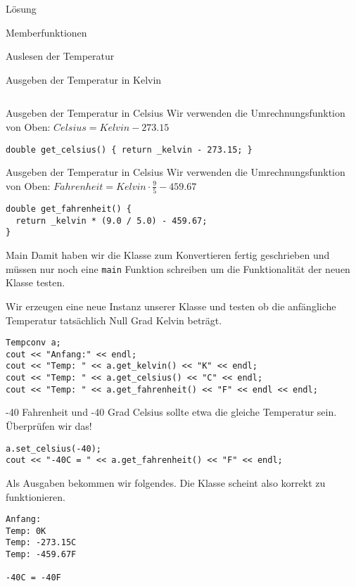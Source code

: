 \documentclass[presentation]{beamer}
\begin{document}
\begin{frame}[label={sec:org40f99e4},fragile]{Lösung}
\begin{block}{Memberfunktionen}
\begin{block}{Auslesen der Temperatur}
\begin{block}{Ausgeben der Temperatur in Kelvin}
\begin{verbatim}
\end{verbatim}
\end{block}
\begin{block}{Ausgeben der Temperatur in Celsius}
Wir verwenden die Umrechnungsfunktion von Oben: \(Celsius = Kelvin - 273.15\)
\begin{verbatim}
double get_celsius() { return _kelvin - 273.15; }
\end{verbatim}
\end{block}
\begin{block}{Ausgeben der Temperatur in Celsius}
Wir verwenden die Umrechnungsfunktion von Oben: \(Fahrenheit = Kelvin \cdot\frac{9}{5} - 459.67\)
\begin{verbatim}
double get_fahrenheit() {
  return _kelvin * (9.0 / 5.0) - 459.67;
}
\end{verbatim}
\end{block}
\end{block}
\end{block}
\begin{block}{Main}
Damit haben wir die Klasse zum Konvertieren fertig geschrieben und
müssen nur noch eine {\color{solarizedYellow}\verb!main!} Funktion schreiben um die Funktionalität
der neuen Klasse testen.

Wir erzeugen eine neue Instanz unserer Klasse und testen ob die
anfängliche Temperatur tatsächlich Null Grad Kelvin beträgt.
\begin{verbatim}
Tempconv a;
cout << "Anfang:" << endl;
cout << "Temp: " << a.get_kelvin() << "K" << endl;
cout << "Temp: " << a.get_celsius() << "C" << endl;
cout << "Temp: " << a.get_fahrenheit() << "F" << endl << endl;
\end{verbatim}
-40 Fahrenheit und -40 Grad Celsius sollte etwa die gleiche Temperatur
 sein. Überprüfen wir das!
\begin{verbatim}
a.set_celsius(-40);
cout << "-40C = " << a.get_fahrenheit() << "F" << endl;
\end{verbatim}
Als Ausgaben bekommen wir folgendes. Die Klasse scheint also korrekt
zu funktionieren.
\begin{verbatim}
Anfang:
Temp: 0K
Temp: -273.15C
Temp: -459.67F

-40C = -40F
\end{verbatim}
\end{block}
\end{frame}
\end{document}
